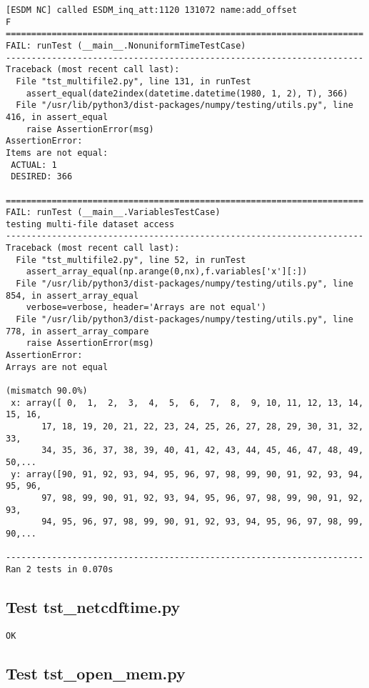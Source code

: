 \begin{verbatim}
[ESDM NC] called ESDM_inq_att:1120 131072 name:add_offset
F
======================================================================
FAIL: runTest (__main__.NonuniformTimeTestCase)
----------------------------------------------------------------------
Traceback (most recent call last):
  File "tst_multifile2.py", line 131, in runTest
    assert_equal(date2index(datetime.datetime(1980, 1, 2), T), 366)
  File "/usr/lib/python3/dist-packages/numpy/testing/utils.py", line 416, in assert_equal
    raise AssertionError(msg)
AssertionError:
Items are not equal:
 ACTUAL: 1
 DESIRED: 366

======================================================================
FAIL: runTest (__main__.VariablesTestCase)
testing multi-file dataset access
----------------------------------------------------------------------
Traceback (most recent call last):
  File "tst_multifile2.py", line 52, in runTest
    assert_array_equal(np.arange(0,nx),f.variables['x'][:])
  File "/usr/lib/python3/dist-packages/numpy/testing/utils.py", line 854, in assert_array_equal
    verbose=verbose, header='Arrays are not equal')
  File "/usr/lib/python3/dist-packages/numpy/testing/utils.py", line 778, in assert_array_compare
    raise AssertionError(msg)
AssertionError:
Arrays are not equal

(mismatch 90.0%)
 x: array([ 0,  1,  2,  3,  4,  5,  6,  7,  8,  9, 10, 11, 12, 13, 14, 15, 16,
       17, 18, 19, 20, 21, 22, 23, 24, 25, 26, 27, 28, 29, 30, 31, 32, 33,
       34, 35, 36, 37, 38, 39, 40, 41, 42, 43, 44, 45, 46, 47, 48, 49, 50,...
 y: array([90, 91, 92, 93, 94, 95, 96, 97, 98, 99, 90, 91, 92, 93, 94, 95, 96,
       97, 98, 99, 90, 91, 92, 93, 94, 95, 96, 97, 98, 99, 90, 91, 92, 93,
       94, 95, 96, 97, 98, 99, 90, 91, 92, 93, 94, 95, 96, 97, 98, 99, 90,...

----------------------------------------------------------------------
Ran 2 tests in 0.070s
\end{verbatim}

\subsection{Test tst\_netcdftime.py}

\begin{verbatim}
OK
\end{verbatim}

\subsection{Test tst\_open\_mem.py}

